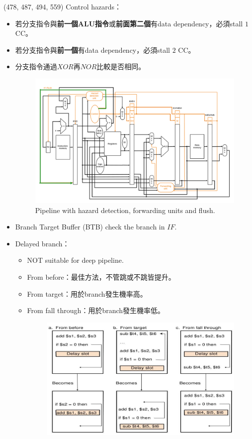 \item \begin{theorem}{(478, 487, 494, 559)} Control hazards：\begin{itemize}
        \item 若分支指令與\textbf{前一個ALU指令}或\textbf{前面第二個}有data dependency，必須stall $1$ CC。
        \item 若分支指令與\textbf{前一個}有data dependency，必須stall $2$ CC。
        \item 分支指令通過$XOR$再$NOR$比較是否相同。
        \begin{figure}[H]
            \centering
            \includegraphics[scale=0.3]{img/pipeline-flush.png}
            \caption{Pipeline with hazard detection, forwarding units and flush.}
            \label{img:pipeline-flush}
        \end{figure}
        \item Branch Target Buffer (BTB) check the branch in $IF$.
        \item Delayed branch：\begin{itemize}
            \item NOT suitable for deep pipeline.
            \item From before：最佳方法，不管跳或不跳皆提升。
            \item From target：用於branch發生機率高。
            \item From fall through：用於branch發生機率低。
            \begin{figure}[H]
                \centering
                \includegraphics[scale=0.6]{img/delayed-branch.jpg}

\end{figure}
\end{itemize}
\end{itemize}
\end{theorem}

